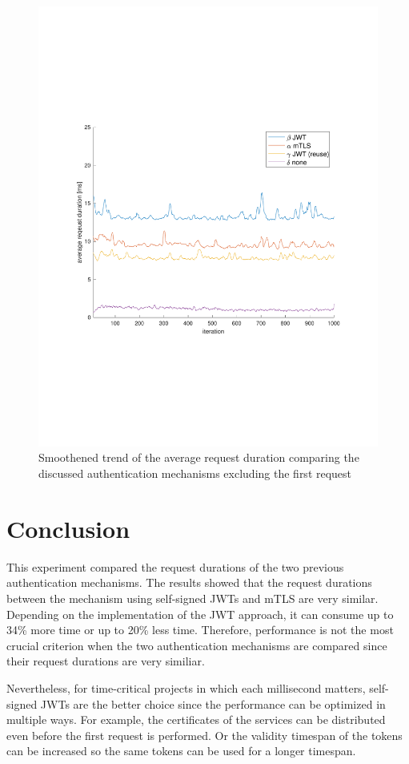 \begin{figure}
	\centering
	\includegraphics[trim=0 200 0 200, clip, width=\textwidth]{images/experiment/experiment-trend.pdf}
	\caption{Smoothened trend of the average request duration comparing the discussed authentication mechanisms excluding the first request}
	\label{fig:trend}
\end{figure}

\section{Conclusion}
This experiment compared the request durations of the two previous authentication mechanisms.
The results showed that the request durations between the mechanism using self-signed JWTs and mTLS are very similar.
Depending on the implementation of the JWT approach, it can consume up to 34\% more time or up to 20\% less time.
Therefore, performance is not the most crucial criterion when the two authentication mechanisms are compared since their request durations are very similiar.

Nevertheless, for time-critical projects in which each millisecond matters, self-signed JWTs are the better choice since the performance can be optimized in multiple ways.
For example, the certificates of the services can be distributed even before the first request is performed.
Or the validity timespan of the tokens can be increased so the same tokens can be used for a longer timespan.
